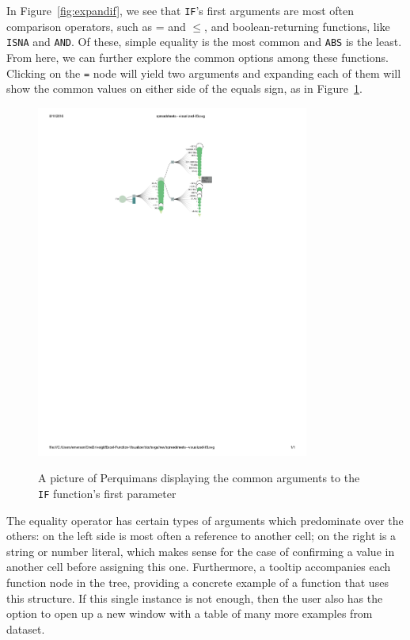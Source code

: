 \documentclass[conference]{IEEEtran}
\newcommand{\toolname}{Perquimans\xspace} \newcommand{\toolnameend}{Perquimans}
\begin{document}
	In Figure~\ref{fig:expandif}, we see that \texttt{IF}'s first arguments are most often comparison operators,
	such as = and $\le$, and boolean-returning functions, like \texttt{ISNA} and \texttt{AND}. Of these,
	simple equality is the most common and \texttt{ABS} is the least. From here, we
	can further explore the common options among these functions. Clicking on the
	\texttt{=} node will yield two arguments and expanding each of them will show
	the common values on either side of the equals sign, as in Figure~\ref{fig:fullpic}. 
	
	\begin{figure}[t] \centering \includegraphics[width=0.8\textwidth]{IFargslabel}
		\caption{A picture of \toolname displaying the common arguments to the \texttt{IF}
			function's first parameter} \centering \label{fig:fullpic} \end{figure}
	
	The equality operator has certain types of arguments
	which predominate over the others: on the left side is most often a reference
	to another cell; on the right is a string or number literal, which makes sense
	for the case of confirming a value in another cell before assigning this one.
	Furthermore, a tooltip accompanies each function node in the tree, providing a
	concrete example of a function that uses this structure. If this single
	instance is not enough, then the user also has the option to open up a new
	window with a table of many more examples from dataset.
	
\end{document}
